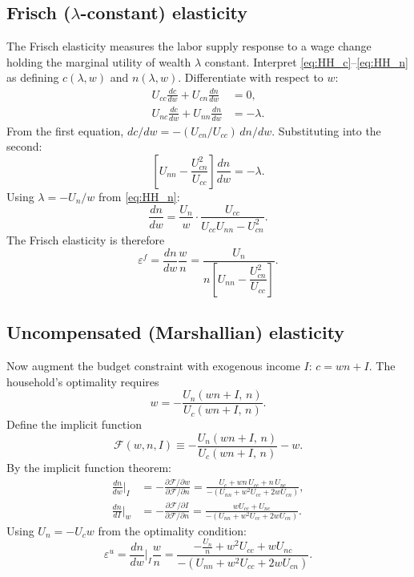 \documentclass[12pt,a4paper]{article}
\theoremstyle{definition}
\theoremstyle{plain}
\theoremstyle{remark}
\begin{document}
\subsection{Frisch ($\lambda$-constant) elasticity}

The Frisch elasticity measures the labor supply response to a wage change holding the marginal utility of wealth $\lambda$ constant. Interpret \eqref{eq:HH_c}--\eqref{eq:HH_n} as defining $c(\lambda, w)$ and $n(\lambda, w)$. Differentiate with respect to $w$:
\begin{align*}
  U_{cc} \frac{dc}{dw} + U_{cn} \frac{dn}{dw} &= 0, \\
  U_{nc} \frac{dc}{dw} + U_{nn} \frac{dn}{dw} &= -\lambda.
\end{align*}
From the first equation, $dc/dw = -(U_{cn}/U_{cc}) \, dn/dw$. Substituting into the second:
\[
  \left[ U_{nn} - \frac{U_{cn}^2}{U_{cc}} \right] \frac{dn}{dw} = -\lambda.
\]
Using $\lambda = -U_n / w$ from \eqref{eq:HH_n}:
\[
  \frac{dn}{dw} = \frac{U_n}{w} \cdot \frac{U_{cc}}{U_{cc} U_{nn} - U_{cn}^2}.
\]
The Frisch elasticity is therefore
\begin{equation}
\label{eq:Frisch}
  \boxed{
  \varepsilon^f = \frac{dn}{dw} \frac{w}{n} = \frac{U_n}{n \left[ U_{nn} - \dfrac{U_{cn}^2}{U_{cc}} \right]}.
  }
\end{equation}

\subsection{Uncompensated (Marshallian) elasticity}

Now augment the budget constraint with exogenous income $I$: $c = wn + I$. The household's optimality requires
\[
  w = -\frac{U_n(wn + I, \, n)}{U_c(wn + I, \, n)}.
\]
Define the implicit function
\[
  \mathcal{F}(w, n, I) \equiv -\frac{U_n(wn + I, \, n)}{U_c(wn + I, \, n)} - w.
\]
By the implicit function theorem:
\begin{align}
  \frac{dn}{dw}\bigg|_I &= -\frac{\partial \mathcal{F} / \partial w}{\partial \mathcal{F} / \partial n}
  = \frac{U_c + wn \, U_{cc} + n \, U_{nc}}{-(U_{nn} + w^2 U_{cc} + 2w U_{cn})},
  \label{eq:dn_dw_uncomp} \\[6pt]
  \frac{dn}{dI}\bigg|_w &= -\frac{\partial \mathcal{F} / \partial I}{\partial \mathcal{F} / \partial n}
  = \frac{w U_{cc} + U_{nc}}{-(U_{nn} + w^2 U_{cc} + 2w U_{cn})}.
  \label{eq:dn_dI}
\end{align}
Using $U_n = -U_c w$ from the optimality condition:
\begin{equation}
\label{eq:eps_u}
  \varepsilon^u = \frac{dn}{dw}\bigg|_I \frac{w}{n}
  = \frac{-\tfrac{U_n}{n} + w^2 U_{cc} + w U_{nc}}{-(U_{nn} + w^2 U_{cc} + 2w U_{cn})}.
\end{equation}
\end{document}

